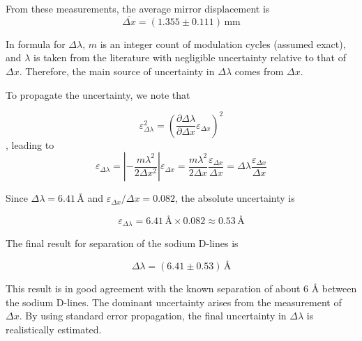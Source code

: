 From these measurements, the average mirror displacement is
\[
\overline{\Delta x} = (1.355 \pm 0.111)\,\text{mm}
\]

In formula for \(\Delta \lambda\), \noindent
$m$ is an integer count of modulation cycles (assumed exact), and 
$\lambda$ is taken from the literature with negligible uncertainty relative to that of $\Delta x$. Therefore, the main source of uncertainty in 
$\Delta \lambda$ comes from $\Delta x$.

\medskip

To propagate the uncertainty, we note that

\[
\varepsilon_{\Delta \lambda}^2 = \left(\frac{\partial \Delta \lambda}{\partial \Delta x}\varepsilon_{\Delta x}\right)^2
\], leading to
\[
\varepsilon_{\Delta \lambda} = \left|-\frac{m \lambda^2}{2 \Delta x^2}\right|\varepsilon_{\Delta x} = \frac{m \lambda^2}{2 \Delta x}\frac{\varepsilon_{\Delta x}}{\Delta x}=\Delta \lambda \frac{\varepsilon_{\Delta x}}{\Delta x}
\]







Since \(\Delta \lambda = 6.41\, \text{Å}\) and \(\varepsilon_{\Delta x}/\Delta x = 0.082\), the absolute uncertainty is

\[
\varepsilon_{\Delta \lambda} =  6.41\,\text{Å} \times 0.082 \approx 0.53\,\text{Å}
\]

The final result for separation of the sodium D-lines is

\[
\Delta \lambda = (6.41 \pm 0.53)\,\text{Å}
\]

This result is in good agreement with the known separation of about 6 Å between the sodium D-lines. The dominant uncertainty arises from the measurement of \(\Delta x\). By using standard error propagation, the final uncertainty in \(\Delta \lambda\) is realistically estimated.




